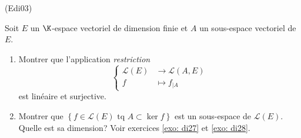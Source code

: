 \begin{tiny}(Edi03)\end{tiny} Soit $E$ un $\K$-espace vectoriel de dimension finie et $A$ un sous-espace vectoriel de $E$.
\begin{enumerate}
  \item Montrer que l'application \emph{restriction }
\begin{displaymath}
  \left\lbrace 
\begin{aligned}
  \mathcal{L}(E) &\rightarrow \mathcal{L}(A,E) \\
  f &\mapsto f_{|A}
\end{aligned}
\right. 
\end{displaymath}
est linéaire et surjective.
  \item Montrer que $\left\lbrace f\in \mathcal{L}(E)\text{ tq } A \subset \ker f \right\rbrace$ est un sous-espace de $\mathcal{L}(E)$. Quelle est sa dimension? Voir exercices \ref{exo: di27} et \ref{exo: di28}.
\end{enumerate}

